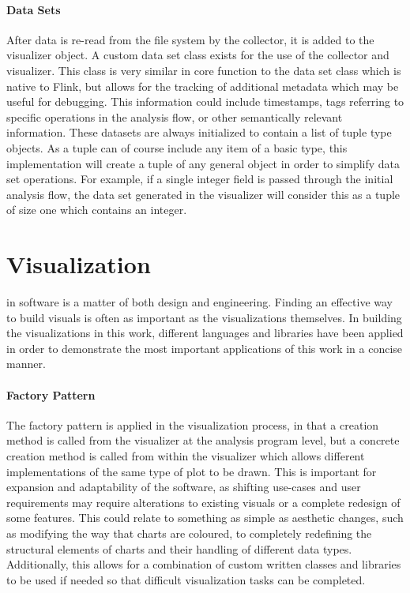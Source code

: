 \paragraph{Data Sets}
After data is re-read from the file system by the collector, it is added to the visualizer object. A custom data set class exists for the use of the collector and visualizer. This class is very similar in core function to the data set class which is native to Flink, but allows for the tracking of additional metadata which may be useful for debugging. This information could include timestamps, tags referring to specific operations in the analysis flow, or other semantically relevant information. These datasets are always initialized to contain a list of tuple type objects. As a tuple can of course include any item of a basic type, this implementation will create a tuple of any general object in order to simplify data set operations. For example, if a single integer field is passed through the initial analysis flow, the data set generated in the visualizer will consider this as a tuple of size one which contains an integer.



\section{Visualization}
\label{visualization}

 in software is a matter of both design and engineering. Finding an effective way to build visuals is often as important as the visualizations themselves. In building the visualizations in this work, different languages and libraries have been applied in order to demonstrate the most important applications of this work in a concise manner. 

\paragraph{Factory Pattern}
The factory pattern \citep{Gamma1995} is applied in the visualization process, in that a creation method is called from the visualizer at the analysis program level, but a concrete creation method is called from within the visualizer which allows different implementations of the same type of plot to be drawn. This is important for expansion and adaptability of the software, as shifting use-cases and user requirements may require alterations to existing visuals or a complete redesign of some features. This could relate to something as simple as aesthetic changes, such as modifying the way that charts are coloured, to completely redefining the structural elements of charts and their handling of different data types. Additionally, this allows for a combination of custom written classes and libraries to be used if needed so that difficult visualization tasks can be completed.

